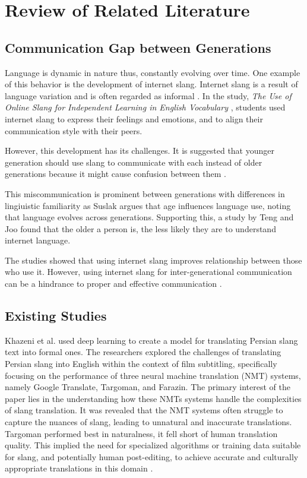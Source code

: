 \chapter{Review of Related Literature}
\label{sec:relatedlit}

\section{Communication Gap between Generations}
Language is dynamic in nature thus, constantly evolving over time. One example of this behavior is the development of internet slang. Internet slang is a result of language variation and is often regarded as informal \cite{Liu_Gui_Zuo_Dai_2019}. In the study, \textit{The Use of Online Slang for Independent Learning in English Vocabulary} \cite{Ambarsari_Amrullah_Nawawi_2020}, students used internet slang to express their feelings and emotions, and to align their communication style with their peers. 

However, this development has its challenges. It is suggested that younger generation should use slang to communicate with each instead of older generations because it might cause confusion between them \cite{Jeresano_Carretero_2022}.

This miscommunication is prominent between generations with differences in lingiuistic familiarity as Suslak \cite{SUSLAK2009199} argues that age influences language use, noting that language evolves across generations.
Supporting this, a study by Teng and Joo \cite{Teng_Joo2023} found that the older a person is, the less likely they are to understand internet language.

The studies showed that using internet slang improves relationship between those who use it. However, using internet slang for inter-generational communication can be a hindrance to proper and effective communication \cite{gonzagaforda}.


\section{Existing Studies}

Khazeni et al. used deep learning to create a model for translating Persian slang text into formal ones. The researchers explored the challenges of translating Persian slang into English within the context of film subtitling, specifically focusing on the performance of three neural machine translation (NMT) systems, namely Google Translate, Targoman, and Farazin. The primary interest of the paper lies in the understanding how these NMTs systems handle  the complexities of slang translation. It was revealed that the NMT systems often struggle to capture the nuances of slang, leading to unnatural and inaccurate translations. Targoman performed best in naturalness, it fell short of human translation quality. This implied the need for specialized algorithms or training data suitable for slang, and potentially human post-editing, to achieve accurate and culturally appropriate translations in this domain \cite{Khazeni}. 

